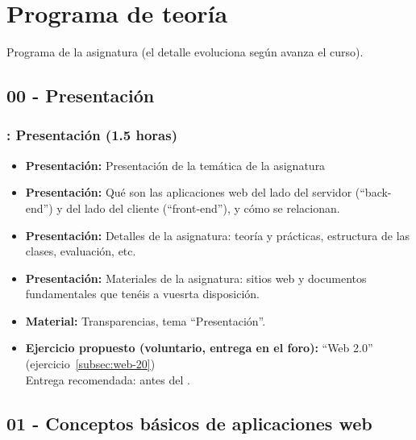 \documentclass[a4paper,12pt]{article}
\begin{document}
\newpage

\section{Programa de teoría}

Programa de la asignatura (el detalle evoluciona según avanza el curso).

\subsection{00 - Presentación}

\subsubsection{\martesA: Presentación  (1.5 horas)}
\label{cal:martesA}

\begin{itemize}
\item \textbf{Presentación:} Presentación de la temática de la asignatura
\item \textbf{Presentación:} Qué son las aplicaciones web del lado del servidor (``back-end'') y del lado del cliente (``front-end''), y cómo se relacionan.
\item \textbf{Presentación:} Detalles de la asignatura: teoría y prácticas, estructura de las clases, evaluación, etc.
\item \textbf{Presentación:} Materiales de la asignatura: sitios web y documentos fundamentales que tenéis a vuesrta disposición.
\item \textbf{Material:} Transparencias, tema ``Presentación''.
\item \textbf{Ejercicio propuesto (voluntario, entrega en el foro):} ``Web 2.0'' (ejercicio~\ref{subsec:web-20}) \\
  Entrega recomendada: antes del \juevesA.
\end{itemize}


\subsection{01 - Conceptos básicos de aplicaciones web}
\end{document}
